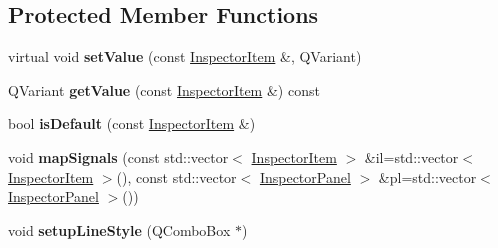\subsection*{Protected Member Functions}
\begin{DoxyCompactItemize}
\item 
\mbox{\label{class_ms_1_1_inspector_base_a5bc7c9c26bb0276c978623e6d0a1f5e3}} 
virtual void {\bfseries set\+Value} (const \hyperlink{struct_ms_1_1_inspector_item}{Inspector\+Item} \&, Q\+Variant)
\item 
\mbox{\label{class_ms_1_1_inspector_base_ab9652a5a480f8ef8c4b165b396d55582}} 
Q\+Variant {\bfseries get\+Value} (const \hyperlink{struct_ms_1_1_inspector_item}{Inspector\+Item} \&) const
\item 
\mbox{\label{class_ms_1_1_inspector_base_a6b2da64630dbe13a1c25918dadc722ef}} 
bool {\bfseries is\+Default} (const \hyperlink{struct_ms_1_1_inspector_item}{Inspector\+Item} \&)
\item 
\mbox{\label{class_ms_1_1_inspector_base_a78f73f16a505df2111d38865908972a8}} 
void {\bfseries map\+Signals} (const std\+::vector$<$ \hyperlink{struct_ms_1_1_inspector_item}{Inspector\+Item} $>$ \&il=std\+::vector$<$ \hyperlink{struct_ms_1_1_inspector_item}{Inspector\+Item} $>$(), const std\+::vector$<$ \hyperlink{struct_ms_1_1_inspector_panel}{Inspector\+Panel} $>$ \&pl=std\+::vector$<$ \hyperlink{struct_ms_1_1_inspector_panel}{Inspector\+Panel} $>$())
\item 
\mbox{\label{class_ms_1_1_inspector_base_a17070b220b359d6ba4e50c638d37bd00}} 
void {\bfseries setup\+Line\+Style} (Q\+Combo\+Box $\ast$)
\end{DoxyCompactItemize}
